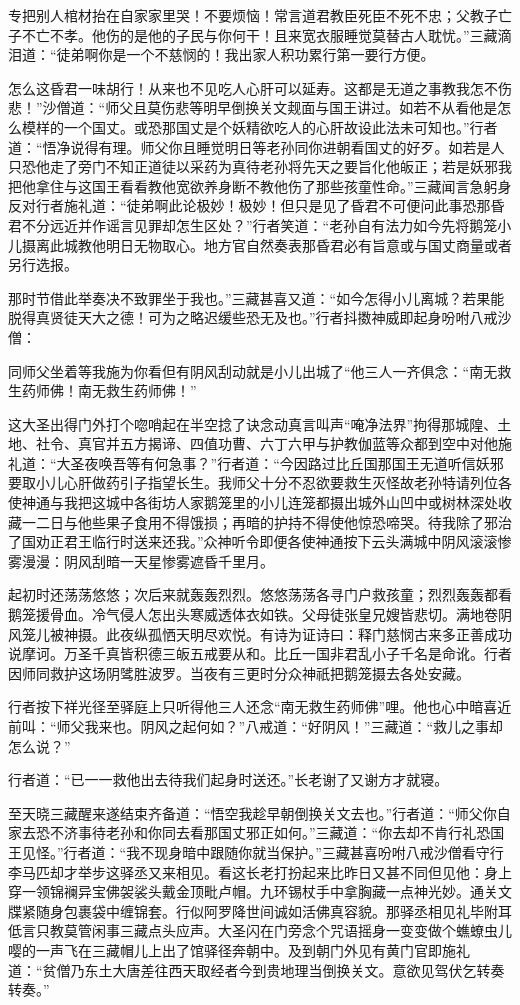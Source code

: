 \documentclass[12pt,UTF8]{ctexbook}
\begin{document}
{	专把别人棺材抬在自家家里哭！不要烦恼！常言道君教臣死臣不死不忠；父教子亡子不亡不孝。他伤的是他的子民与你何干！且来宽衣服睡觉莫替古人耽忧。”三藏滴泪道：“徒弟啊你是一个不慈悯的！我出家人积功累行第一要行方便。
	
	怎么这昏君一味胡行！从来也不见吃人心肝可以延寿。这都是无道之事教我怎不伤悲！”沙僧道：“师父且莫伤悲等明早倒换关文觌面与国王讲过。如若不从看他是怎么模样的一个国丈。或恐那国丈是个妖精欲吃人的心肝故设此法未可知也。”行者道：“悟净说得有理。师父你且睡觉明日等老孙同你进朝看国丈的好歹。如若是人只恐他走了旁门不知正道徒以采药为真待老孙将先天之要旨化他皈正；若是妖邪我把他拿住与这国王看看教他宽欲养身断不教他伤了那些孩童性命。”三藏闻言急躬身反对行者施礼道：“徒弟啊此论极妙！极妙！但只是见了昏君不可便问此事恐那昏君不分远近并作谣言见罪却怎生区处？”行者笑道：“老孙自有法力如今先将鹅笼小儿摄离此城教他明日无物取心。地方官自然奏表那昏君必有旨意或与国丈商量或者另行选报。
	
	那时节借此举奏决不致罪坐于我也。”三藏甚喜又道：“如今怎得小儿离城？若果能脱得真贤徒天大之德！可为之略迟缓些恐无及也。”行者抖擞神威即起身吩咐八戒沙僧：
	
	同师父坐着等我施为你看但有阴风刮动就是小儿出城了“他三人一齐俱念：“南无救生药师佛！南无救生药师佛！”
	
	这大圣出得门外打个唿哨起在半空捻了诀念动真言叫声“唵净法界”拘得那城隍、土地、社令、真官并五方揭谛、四值功曹、六丁六甲与护教伽蓝等众都到空中对他施礼道：“大圣夜唤吾等有何急事？”行者道：“今因路过比丘国那国王无道听信妖邪要取小儿心肝做药引子指望长生。我师父十分不忍欲要救生灭怪故老孙特请列位各使神通与我把这城中各街坊人家鹅笼里的小儿连笼都摄出城外山凹中或树林深处收藏一二日与他些果子食用不得饿损；再暗的护持不得使他惊恐啼哭。待我除了邪治了国劝正君王临行时送来还我。”众神听令即便各使神通按下云头满城中阴风滚滚惨雾漫漫：阴风刮暗一天星惨雾遮昏千里月。
	
	起初时还荡荡悠悠；次后来就轰轰烈烈。悠悠荡荡各寻门户救孩童；烈烈轰轰都看鹅笼援骨血。冷气侵人怎出头寒威透体衣如铁。父母徒张皇兄嫂皆悲切。满地卷阴风笼儿被神摄。此夜纵孤恓天明尽欢悦。有诗为证诗曰：释门慈悯古来多正善成功说摩诃。万圣千真皆积德三皈五戒要从和。比丘一国非君乱小子千名是命讹。行者因师同救护这场阴骘胜波罗。当夜有三更时分众神祇把鹅笼摄去各处安藏。
	
	行者按下祥光径至驿庭上只听得他三人还念“南无救生药师佛”哩。他也心中暗喜近前叫：“师父我来也。阴风之起何如？”八戒道：“好阴风！”三藏道：“救儿之事却怎么说？”
	
	行者道：“已一一救他出去待我们起身时送还。”长老谢了又谢方才就寝。
	
	至天晓三藏醒来遂结束齐备道：“悟空我趁早朝倒换关文去也。”行者道：“师父你自家去恐不济事待老孙和你同去看那国丈邪正如何。”三藏道：“你去却不肯行礼恐国王见怪。”行者道：“我不现身暗中跟随你就当保护。”三藏甚喜吩咐八戒沙僧看守行李马匹却才举步这驿丞又来相见。看这长老打扮起来比昨日又甚不同但见他：身上穿一领锦襕异宝佛袈裟头戴金顶毗卢帽。九环锡杖手中拿胸藏一点神光妙。通关文牒紧随身包裹袋中缠锦套。行似阿罗降世间诚如活佛真容貌。那驿丞相见礼毕附耳低言只教莫管闲事三藏点头应声。大圣闪在门旁念个咒语摇身一变变做个蟭蟟虫儿嘤的一声飞在三藏帽儿上出了馆驿径奔朝中。及到朝门外见有黄门官即施礼道：“贫僧乃东土大唐差往西天取经者今到贵地理当倒换关文。意欲见驾伏乞转奏转奏。”
	
}
\end{document}
